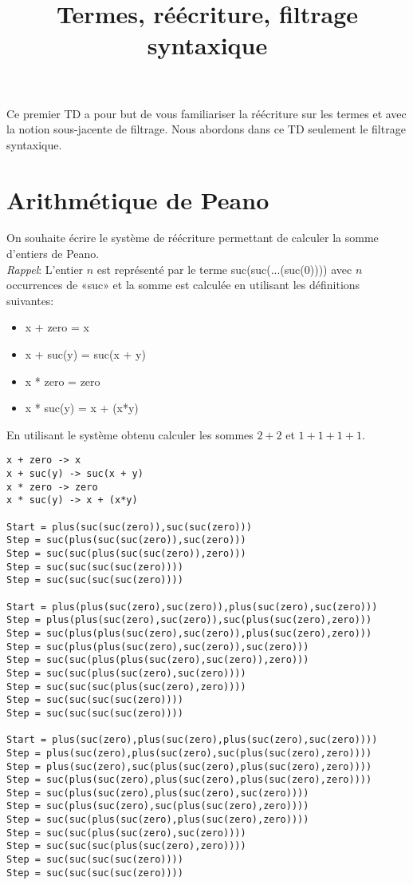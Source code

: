 \documentclass[11pt]{article}
\title{Termes, réécriture, filtrage syntaxique}
\begin{document}
\maketitle

Ce premier TD a pour but de vous familiariser la réécriture sur les
termes et avec la notion sous-jacente de filtrage. Nous abordons dans
ce TD seulement le filtrage syntaxique.

\section{Arithmétique  de Peano}

On souhaite écrire le système de réécriture permettant de calculer la
somme d'entiers de Peano. \\
\textit{Rappel}: L'entier $n$ est représenté par le terme
suc(suc(...(suc($0$)))) avec $n$ occurrences de «suc» et la somme est
calculée en utilisant les définitions suivantes:
%
\begin{itemize}
\item[] x + zero = x
\item[] x + suc(y) = suc(x + y)
\item[] x * zero = zero 
\item[] x * suc(y) = x + (x*y)
\end{itemize}

En utilisant le système obtenu calculer les sommes $2+2$ et $1+1+1+1$. 

\begin{versionProf}
\begin{verbatim}
x + zero -> x
x + suc(y) -> suc(x + y)
x * zero -> zero 
x * suc(y) -> x + (x*y)

Start = plus(suc(suc(zero)),suc(suc(zero))) 
Step = suc(plus(suc(suc(zero)),suc(zero)))
Step = suc(suc(plus(suc(suc(zero)),zero)))
Step = suc(suc(suc(suc(zero))))
Step = suc(suc(suc(suc(zero))))

Start = plus(plus(suc(zero),suc(zero)),plus(suc(zero),suc(zero)))
Step = plus(plus(suc(zero),suc(zero)),suc(plus(suc(zero),zero)))
Step = suc(plus(plus(suc(zero),suc(zero)),plus(suc(zero),zero)))
Step = suc(plus(plus(suc(zero),suc(zero)),suc(zero)))
Step = suc(suc(plus(plus(suc(zero),suc(zero)),zero)))
Step = suc(suc(plus(suc(zero),suc(zero))))
Step = suc(suc(suc(plus(suc(zero),zero))))
Step = suc(suc(suc(suc(zero))))
Step = suc(suc(suc(suc(zero))))

Start = plus(suc(zero),plus(suc(zero),plus(suc(zero),suc(zero))))
Step = plus(suc(zero),plus(suc(zero),suc(plus(suc(zero),zero))))
Step = plus(suc(zero),suc(plus(suc(zero),plus(suc(zero),zero))))
Step = suc(plus(suc(zero),plus(suc(zero),plus(suc(zero),zero))))
Step = suc(plus(suc(zero),plus(suc(zero),suc(zero))))
Step = suc(plus(suc(zero),suc(plus(suc(zero),zero))))
Step = suc(suc(plus(suc(zero),plus(suc(zero),zero))))
Step = suc(suc(plus(suc(zero),suc(zero))))
Step = suc(suc(suc(plus(suc(zero),zero))))
Step = suc(suc(suc(suc(zero))))
Step = suc(suc(suc(suc(zero))))

\end{verbatim}
\end{versionProf}
\end{document}
